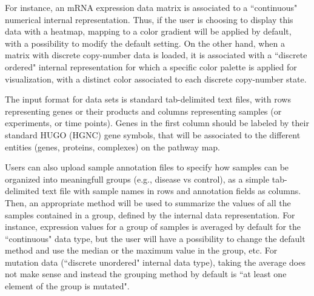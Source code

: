 \documentclass[a4,center,fleqn]{NAR}
\begin{document}
For instance, an mRNA expression data matrix is associated to a
``continuous" numerical internal representation. Thus, if the user is choosing to display
this data with a heatmap, mapping to a color gradient will be applied by default, with a possibility
to modify the default setting. On the other hand, when a
matrix with discrete copy-number data is loaded, it is associated with a
``discrete ordered" internal representation for which
a specific color palette is applied for visualization,
with a distinct color associated to each discrete copy-number state.

The input format for data sets is standard tab-delimited text files, with rows
representing genes or their products and columns representing samples (or experiments, or time
points). Genes in the first column should be labeled by their standard HUGO (HGNC)
gene symbols, that will be associated to the different entities (genes,
proteins, complexes) on the pathway map. 

Users can also upload sample annotation files to specify how samples can be organized into meaningfull groups
(e.g., disease vs control), as a simple tab-delimited text file with sample names in
rows and annotation fields as columns. Then, an appropriate method will be used
to summarize the values of all the samples contained in a group, defined by the
internal data representation. For instance, expression values for a group of samples
is averaged by default for the ``continuous" data type, but the user will have
a possibility to change the default method and use the median or
the maximum value in the group, etc. For mutation data (``discrete unordered" internal data type),
taking the average does not make sense and instead the grouping method by default is
``at least one element of the group is mutated".

\begin{table}
{
}
\end{table}
\end{document}
